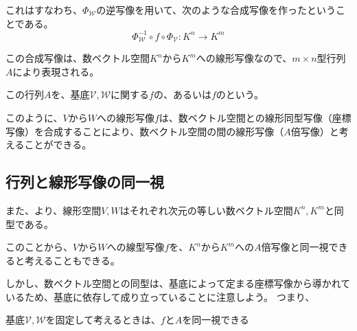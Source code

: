 \documentclass[../../../topic_linear-algebra]{subfiles}
\begin{document}
これはすなわち、$\Phi_{\mathcal{W}}$の逆写像を用いて、次のような合成写像を作ったということである。
\begin{equation}\label{eq:coordinate-rep-of-f}
  \Phi_\mathcal{W}^{-1} \circ f \circ \Phi_\mathcal{V} \colon K^n \to K^m
\end{equation}

この合成写像は、数ベクトル空間$K^n$から$K^m$への線形写像なので、$m \times n$型行列$A$により表現される。

この行列$A$を、基底$\mathcal{V}, \mathcal{W}$に関する$f$の、あるいは$f$のという。

\begin{mindflow}
\end{mindflow}

このように、$V$から$W$への線形写像$f$は、数ベクトル空間との線形同型写像（座標写像）を合成することにより、数ベクトル空間の間の線形写像（$A$倍写像）と考えることができる。

\subsection{行列と線形写像の同一視}

また、より、線形空間$V,W$はそれぞれ次元の等しい数ベクトル空間$K^n,K^m$と同型である。

\br

このことから、$V$から$W$への線型写像$f$を、$K^n$から$K^m$への$A$倍写像と同一視できると考えることもできる。
\begin{center}
\end{center}

\br

しかし、数ベクトル空間との同型は、基底によって定まる座標写像から導かれているため、基底に依存して成り立っていることに注意しよう。
つまり、
\begin{emphabox}
  \begin{spacebox}
    \begin{center}
      基底$\mathcal{V},\mathcal{W}$を固定して考えるときは、$f$と$A$を同一視できる
    \end{center}
  \end{spacebox}
\end{emphabox}
\end{document}
